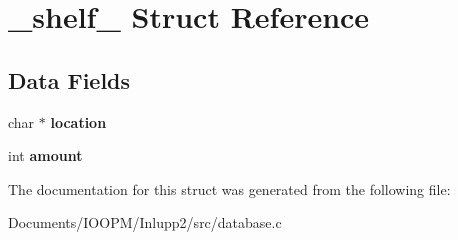 \hypertarget{struct__shelf__}{}\section{\+\_\+shelf\+\_\+ Struct Reference}
\label{struct__shelf__}
\subsection*{Data Fields}
\begin{DoxyCompactItemize}
\item 
\hypertarget{struct__shelf___a6a0d5603410d5eda93c0ff341966cce1}{}char $\ast$ {\bfseries location}\label{struct__shelf___a6a0d5603410d5eda93c0ff341966cce1}

\item 
\hypertarget{struct__shelf___a14236de313193a14b4dbdf442bcf2bb9}{}int {\bfseries amount}\label{struct__shelf___a14236de313193a14b4dbdf442bcf2bb9}

\end{DoxyCompactItemize}


The documentation for this struct was generated from the following file\+:\begin{DoxyCompactItemize}
\item 
Documents/\+I\+O\+O\+P\+M/\+Inlupp2/src/database.\+c\end{DoxyCompactItemize}
